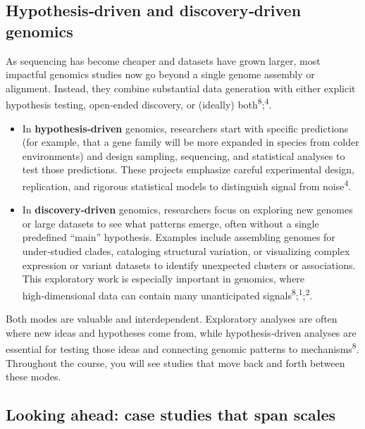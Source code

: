 \documentclass[
  letterpaper,
  DIV=11,
  numbers=noendperiod]{scrreprt}
\begin{document}
\subsection{Hypothesis‑driven and discovery‑driven
genomics}\label{hypothesisdriven-and-discoverydriven-genomics}

As sequencing has become cheaper and datasets have grown larger, most
impactful genomics studies now go beyond a single genome assembly or
alignment. Instead, they combine substantial data generation with either
explicit hypothesis testing, open‑ended discovery, or (ideally)
both\textsuperscript{8};\textsuperscript{4}.

\begin{itemize}
\item
  In \textbf{hypothesis‑driven} genomics, researchers start with
  specific predictions (for example, that a gene family will be more
  expanded in species from colder environments) and design sampling,
  sequencing, and statistical analyses to test those predictions. These
  projects emphasize careful experimental design, replication, and
  rigorous statistical models to distinguish signal from
  noise\textsuperscript{4}.
\item
  In \textbf{discovery‑driven} genomics, researchers focus on exploring
  new genomes or large datasets to see what patterns emerge, often
  without a single predefined ``main'' hypothesis. Examples include
  assembling genomes for under‑studied clades, cataloging structural
  variation, or visualizing complex expression or variant datasets to
  identify unexpected clusters or associations. This exploratory work is
  especially important in genomics, where high‑dimensional data can
  contain many unanticipated
  signals\textsuperscript{8};\textsuperscript{1};\textsuperscript{2}.
\end{itemize}

Both modes are valuable and interdependent. Exploratory analyses are
often where new ideas and hypotheses come from, while hypothesis‑driven
analyses are essential for testing those ideas and connecting genomic
patterns to mechanisms\textsuperscript{8}. Throughout the course, you
will see studies that move back and forth between these modes.

\subsection{Looking ahead: case studies that span
scales}\label{looking-ahead-case-studies-that-span-scales}
\end{document}
